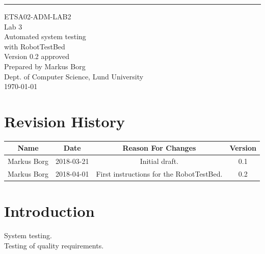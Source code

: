 \documentclass{scrreprt}
\date{}
\def\myversion{0.2 }
\begin{document}
\begin{flushright}
    \rule{16cm}{5pt}\vskip1cm
    \begin{bfseries}
    	\LARGE{ETSA02-ADM-LAB2}\\
    	\vspace{1.5cm}
        \Huge{Lab 3}\\
        \vspace{0.5cm}
        Automated system testing\\
        \vspace{0.5cm}
        with RobotTestBed\\
        \vspace{1.5cm}
        \LARGE{Version \myversion approved}\\
        \vspace{1.5cm}
        Prepared by Markus Borg\\
        Dept. of Computer Science, Lund University\\
        \vspace{1.5cm}
        \today\\
    \end{bfseries}
\end{flushright}


\chapter*{Revision History}

\begin{center}
    \begin{tabular}{|c|c|c|c|}
        \hline
	    Name & Date & Reason For Changes & Version\\
        \hline
	    Markus Borg & 2018-03-21 & Initial draft. & 0.1\\
        \hline
        Markus Borg & 2018-04-01 & First instructions for the RobotTestBed. & 0.2\\
        \hline
    \end{tabular}
\end{center}

\chapter{Introduction}
System testing.\\
Testing of quality requirements.
\end{document}
